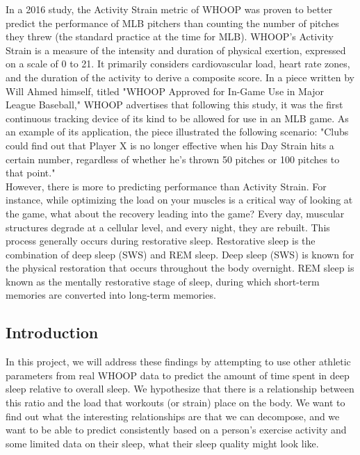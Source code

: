 \documentclass{article}
\begin{document}
In a 2016 study, the Activity Strain metric of WHOOP was proven to better predict the performance of MLB pitchers than counting the number of pitches they threw (the standard practice at the time for MLB). WHOOP's Activity Strain is a measure of the intensity and duration of physical exertion, expressed on a scale of 0 to 21. It primarily considers cardiovascular load, heart rate zones, and the duration of the activity to derive a composite score. In a piece written by Will Ahmed himself, titled "WHOOP Approved for In-Game Use in Major League Baseball," WHOOP advertises that following this study, it was the first continuous tracking device of its kind to be allowed for use in an MLB game. As an example of its application, the piece illustrated the following scenario: "Clubs could find out that Player X is no longer effective when his Day Strain hits a certain number, regardless of whether he’s thrown 50 pitches or 100 pitches to that point." \cite{ahmed2017} \\

However, there is more to predicting performance than Activity Strain. For instance, while optimizing the load on your muscles is a critical way of looking at the game, what about the recovery leading into the game? Every day, muscular structures degrade at a cellular level, and every night, they are rebuilt. This process generally occurs during restorative sleep. Restorative sleep is the combination of deep sleep (SWS) and REM sleep. Deep sleep (SWS) is known for the physical restoration that occurs throughout the body overnight. REM sleep is known as the mentally restorative stage of sleep, during which short-term memories are converted into long-term memories. \cite{whoop2023restorative}

\subsection{\hspace{0.5em} Introduction}

In this project, we will address these findings by attempting to use other athletic parameters from real WHOOP data to predict the amount of time spent in deep sleep relative to overall sleep. We hypothesize that there is a relationship between this ratio and the load that workouts (or strain) place on the body. We want to find out what the interesting relationships are that we can decompose, and we want to be able to predict consistently based on a person's exercise activity and some limited data on their sleep, what their sleep quality might look like.
\end{document}
